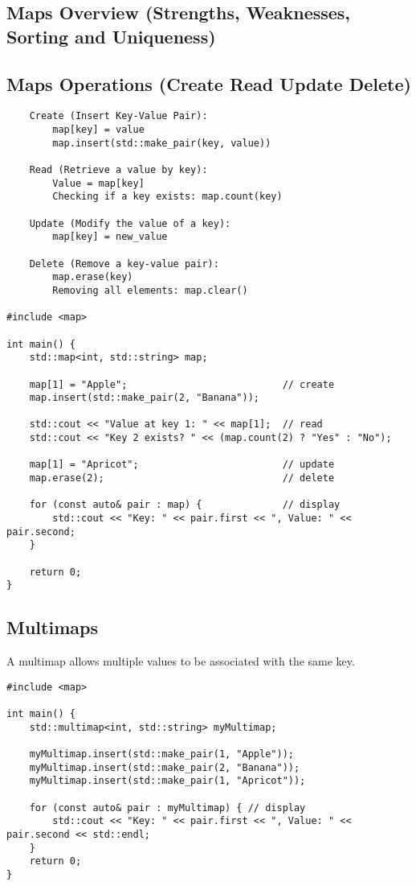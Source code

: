  
\subsection{Maps Overview (Strengths, Weaknesses, Sorting and Uniqueness)}

\subsection{Maps Operations (Create Read Update Delete)}

\begin{verbatim}
    Create (Insert Key-Value Pair):
        map[key] = value 
        map.insert(std::make_pair(key, value))

    Read (Retrieve a value by key):
        Value = map[key]
        Checking if a key exists: map.count(key)

    Update (Modify the value of a key):
        map[key] = new_value

    Delete (Remove a key-value pair):
        map.erase(key)
        Removing all elements: map.clear()

#include <map>

int main() {
    std::map<int, std::string> map;

    map[1] = "Apple";                           // create
    map.insert(std::make_pair(2, "Banana"));

    std::cout << "Value at key 1: " << map[1];  // read
    std::cout << "Key 2 exists? " << (map.count(2) ? "Yes" : "No");

    map[1] = "Apricot";                         // update
    map.erase(2);                               // delete

    for (const auto& pair : map) {              // display
        std::cout << "Key: " << pair.first << ", Value: " << pair.second;
    }

    return 0;
}
\end{verbatim}

\subsection{Multimaps}

A multimap allows multiple values to be associated with the same key. 

\begin{verbatim}
#include <map>

int main() {
    std::multimap<int, std::string> myMultimap;

    myMultimap.insert(std::make_pair(1, "Apple"));
    myMultimap.insert(std::make_pair(2, "Banana"));
    myMultimap.insert(std::make_pair(1, "Apricot"));

    for (const auto& pair : myMultimap) { // display
        std::cout << "Key: " << pair.first << ", Value: " << pair.second << std::endl;
    }
    return 0;
}
\end{verbatim}

